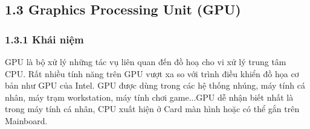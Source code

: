 \documentclass[a4paper]{article}
\newcommand{\gachdau}{\hspace*{1.5em}\ignorespaces}
\begin{document}
            

        \subsection*{1.3 Graphics Processing Unit (GPU)}
            \subsubsection*{1.3.1 Khái niệm}
                \gachdau
                GPU là bộ xử lý những tác vụ liên quan đến đồ hoạ cho vi xử lý trung tâm CPU. Rất nhiều tính năng trên GPU vượt xa so với trình điều khiển đồ họa cơ bản như GPU của Intel. GPU được dùng trong các hệ thống nhúng, máy tính cá nhân, máy trạm workstation, máy tính chơi game...GPU dễ nhận biết nhất là trong máy tính cá nhân, CPU xuất hiện ở Card màn hình hoặc có thể gắn trên Mainboard.
    
\end{document}
